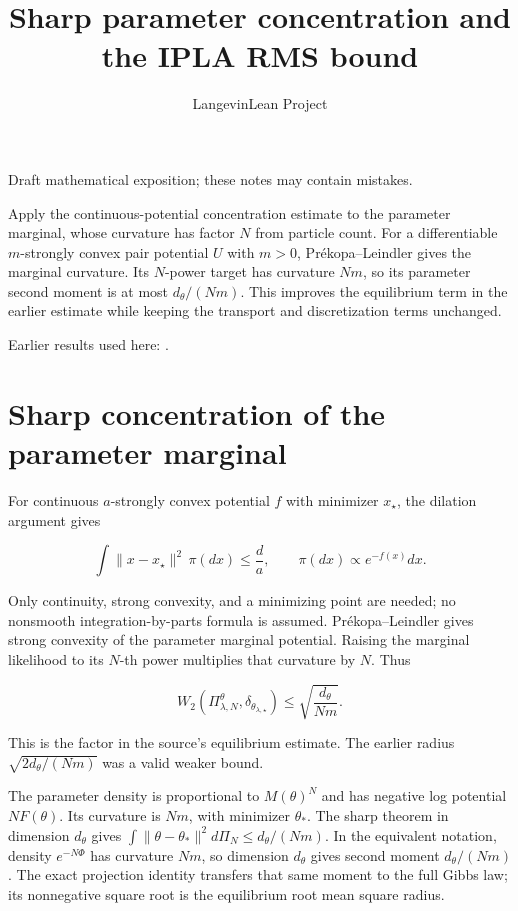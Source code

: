 \documentclass[11pt,a4paper]{article}
\title{\texorpdfstring{Sharp parameter concentration and the IPLA RMS bound}{Sharp parameter concentration and the IPLA RMS bound}}
\author{LangevinLean Project}
\date{}
\begin{document}
\maketitle
Draft mathematical exposition; these notes may contain mistakes.


Apply the continuous-potential concentration estimate to the parameter marginal, whose curvature has factor \(N\) from particle count. For a differentiable \(m\)-strongly convex pair potential \(U\) with \(m>0\), Prékopa–Leindler gives the marginal curvature. Its \(N\)-power target has curvature \(Nm\), so its parameter second moment is at most \(d_\theta/(Nm)\). This improves the equilibrium term in the earlier estimate while keeping the transport and discretization terms unchanged.



Earlier results used here: \cite[Section~3.19]{LangevinLean2026IPLA}.

\section{\texorpdfstring{Sharp concentration of the parameter marginal}{Sharp concentration of the parameter marginal}}


For continuous \(a\)-strongly convex potential \(f\) with minimizer \(x_\star\), the dilation argument gives

\[
\int\|x-x_\star\|^2\,\pi(dx)\le\frac d a,
\qquad\pi(dx)\propto e^{-f(x)}dx.
\]

Only continuity, strong convexity, and a minimizing point are needed; no nonsmooth integration-by-parts formula is assumed. Prékopa–Leindler gives strong convexity of the parameter marginal potential. Raising the marginal likelihood to its \(N\)-th power multiplies that curvature by \(N\). Thus

\[
W_2(\Pi_{\lambda,N}^{\theta},\delta_{\theta_{\lambda,\star}})
\le\sqrt{\frac{d_\theta}{Nm}}.
\]

This is the factor in the source’s equilibrium estimate. The earlier radius \(\sqrt{2d_\theta/(Nm)}\) was a valid weaker bound.



The parameter density is proportional to \(M(\theta)^N\) and has negative log potential \(NF(\theta)\). Its curvature is \(Nm\), with minimizer \(\theta_*\). The sharp theorem in dimension \(d_\theta\) gives \(\int\|\theta-\theta_*\|^2d\Pi_N\le d_\theta/(Nm)\). In the equivalent notation, density \(e^{-N\Phi}\) has curvature \(Nm\), so dimension \(d_\theta\) gives second moment \(d_\theta/(Nm)\). The exact projection identity transfers that same moment to the full Gibbs law; its nonnegative square root is the equilibrium root mean square radius.
\end{document}
